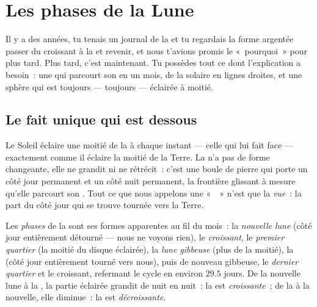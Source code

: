 \chapter{Les phases de la Lune}\label{ch:g7:moon-phases}

Il y a des années, tu tenais un journal de la  et tu regardais la
forme argentée passer du croissant à la  et revenir, et
nous t'avions promis le «~pourquoi~» pour plus tard. Plus tard, c'est
maintenant. Tu possèdes tout ce dont l'explication a besoin~: une
 qui parcourt son  en un mois, de la  solaire en
lignes droites, et une sphère qui est toujours --- toujours ---
éclairée à moitié.

\section{Le fait unique qui est dessous}

\begin{proposition}\label{prop:g7:moon-phases:halflit}
Le Soleil éclaire une moitié de la  à chaque instant --- celle
qui lui fait face --- exactement comme il éclaire la moitié de la
Terre. La  n'a pas de forme changeante, elle ne grandit ni ne
rétrécit~: c'est une boule de pierre qui porte un côté jour permanent
et un côté nuit permanent, la frontière glissant à mesure qu'elle
parcourt son . Tout ce que nous appelons une «~~» n'est
que la \emph{vue}~: la part du côté jour qui se trouve tournée vers
la Terre.
\end{proposition}

\begin{definition}[Phases]\label{def:g7:moon-phases:phases}
Les \emph{phases} de la  sont ses formes apparentes
au fil du mois~: la \emph{nouvelle lune} (côté jour entièrement
détourné --- nous ne voyons rien), le \emph{croissant}, le
\emph{premier quartier} (la moitié du disque éclairée), la
\emph{lune gibbeuse} (plus de la moitié), la \emph{} (côté
jour entièrement tourné vers nous), puis de nouveau gibbeuse, le
\emph{dernier quartier} et le croissant, refermant le cycle en
environ $29.5$ jours. De la nouvelle lune à la , la partie
éclairée grandit de nuit en nuit~: la  est
\emph{croissante}~; de la  à la
nouvelle, elle diminue~: la  est
\emph{décroissante}.
\end{definition}

